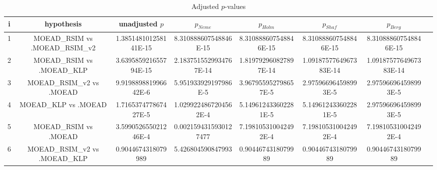 \documentclass[a4paper,10pt]{article}
\begin{document}
\begin{landscape}
\begin{table}[!htp]
\centering\tiny
\caption{Adjusted $p$-values}
\begin{tabular}{cccccccc}
i&hypothesis&unadjusted $p$&$p_{Neme}$&$p_{Holm}$&$p_{Shaf}$&$p_{Berg}$\\
\hline
1&MOEAD_RSIM vs .MOEAD_RSIM_v2&1.385148101258141E-15&8.310888607548846E-15&8.310888607548846E-15&8.310888607548846E-15&8.310888607548846E-15\\
2&MOEAD_RSIM vs .MOEAD_KLP&3.639585921655794E-15&2.1837515529934767E-14&1.819792960827897E-14&1.0918757764967383E-14&1.0918757764967383E-14\\
3&MOEAD_RSIM_v2 vs .MOEAD&9.919889881996642E-6&5.951933929197986E-5&3.967955952798657E-5&2.975966964598993E-5&2.975966964598993E-5\\
4&MOEAD_KLP vs .MOEAD&1.716537477867427E-5&1.0299224867204562E-4&5.149612433602281E-5&5.149612433602281E-5&2.975966964598993E-5\\
5&MOEAD_RSIM vs .MOEAD&3.599052655021246E-4&0.0021594315930127477&7.198105310042492E-4&7.198105310042492E-4&7.198105310042492E-4\\
6&MOEAD_RSIM_v2 vs .MOEAD_KLP&0.9044674318079989&5.426804590847993&0.9044674318079989&0.9044674318079989&0.9044674318079989\\
\hline
\end{tabular}
\end{table}

\end{landscape}
\end{document}
